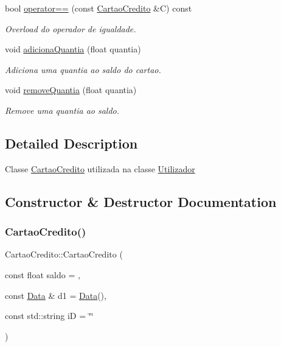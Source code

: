 \begin{DoxyCompactItemize}
bool \hyperlink{classCartaoCredito_abf34d4aff89aac4b76d9e15999d85a26}{operator==} (const \hyperlink{classCartaoCredito}{Cartao\+Credito} \&C) const
\begin{DoxyCompactList}\small\item\em Overload do operador de igualdade. \end{DoxyCompactList}\item 
void \hyperlink{classCartaoCredito_a03d4e7d9d645737bc3d162daf3555e25}{adiciona\+Quantia} (float quantia)
\begin{DoxyCompactList}\small\item\em Adiciona uma quantia ao saldo do cartao. \end{DoxyCompactList}\item 
void \hyperlink{classCartaoCredito_a57d3f8baa86eb9a8f348dc7cbc91ea42}{remove\+Quantia} (float quantia)
\begin{DoxyCompactList}\small\item\em Remove uma quantia ao saldo. \end{DoxyCompactList}\end{DoxyCompactItemize}


\subsection{Detailed Description}
Classe \hyperlink{classCartaoCredito}{Cartao\+Credito} utilizada na classe \hyperlink{classUtilizador}{Utilizador} 

\subsection{Constructor \& Destructor Documentation}
\mbox{\label{classCartaoCredito_a49b6298290f8307df4a42b15175fb10f}} 
\subsubsection{\texorpdfstring{Cartao\+Credito()}{CartaoCredito()}}
{\footnotesize\ttfamily Cartao\+Credito\+::\+Cartao\+Credito (\begin{DoxyParamCaption}\item[{const float}]{saldo = {},  }\item[{const \hyperlink{classData}{Data} \&}]{d1 = {\ttfamily \hyperlink{classData}{Data}()},  }\item[{const std\+::string}]{iD = {\ttfamily \char`\"{}\char`\"{}} }\end{DoxyParamCaption})}




